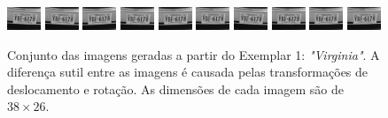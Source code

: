 \begin{figure}[H]
	\centering
	\caption{\label{fig:frames}
	Conjunto das imagens geradas a partir do Exemplar 1: \emph{"Virginia"}. A diferença sutil entre as imagens é causada pelas transformações de deslocamento e rotação.
	As dimensões de cada imagem são de $38 \times 26$.}
	\includegraphics{figures/degradedImg/result-0.png}
	\includegraphics{figures/degradedImg/result-1.png}
	\includegraphics{figures/degradedImg/result-2.png}
	\includegraphics{figures/degradedImg/result-3.png}
	\includegraphics{figures/degradedImg/result-4.png}
	\includegraphics{figures/degradedImg/result-5.png}
	\includegraphics{figures/degradedImg/result-6.png}
	\includegraphics{figures/degradedImg/result-7.png}
	\includegraphics{figures/degradedImg/result-8.png}
	\includegraphics{figures/degradedImg/result-9.png} 


\end{figure}
